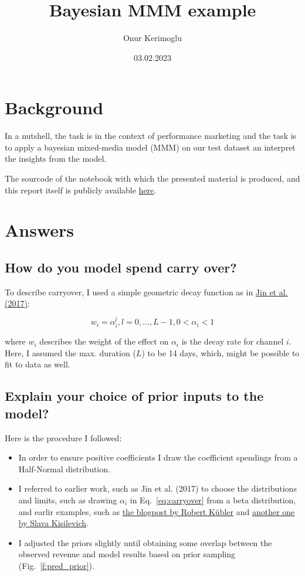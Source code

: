 \documentclass[a4paper,10pt]{scrartcl}
\title{Bayesian MMM example}
\author{Onur Kerimoglu}
\date{03.02.2023}
\begin{document}
\maketitle

\section{Background}
In a nutshell, the task is in the context of performance marketing and the task is to apply a bayesian mixed-media model (MMM) on our test dataset an interpret the insights from the model.

The sourcode of the notebook with which the presented material is produced, and this report itself is publicly available \href{https://github.com/OnurKerimoglu/bayesian_mmm/examples/bayesian_mmm_example_enhanced_newdataset.ipynb}{here}.

\section{Answers}

\subsection{How do you model spend carry over?}

To describe carryover, I used a simple geometric decay function as in \href{https://static.googleusercontent.com/media/research.google.com/en//pubs/archive/46001.pdf}{Jin et al. (2017)}:

\begin{equation}\label{eq:carryover}
 w_i = \alpha_i^l, l=0,...,L-1, 0<\alpha_i<1
\end{equation}

where $w_i$ describes the weight of the effect on   $\alpha_i$ is the decay rate for channel $i$. Here, I assumed the max. duration ($L$) to be 14 days, which, might be possible to fit to data as well.

\subsection {Explain your choice of prior inputs to the model?}

Here is the procedure I followed:
\begin{itemize}
 \item In order to ensure positive coefficients I draw the coefficient spendings from a Half-Normal distribution.
 \item I referred to earlier work, such as Jin et al. (2017) to choose the distributions and limits, such as drawing $\alpha_i$ in Eq.~\ref{eq:carryover} from a beta distribution, and earlir examples, such as \href{https://towardsdatascience.com/bayesian-marketing-mix-modeling-in-python-via-pymc3-7b2071f6001a}{the blogpost by Robert Kübler} and \href{https://towardsdatascience.com/modeling-marketing-mix-using-pymc3-ba18dd9e6e68}{another one by Slava Kisilevich}.
 \item I adjusted the priors slightly until obtaining some overlap between the observed revenue and model results based on prior sampling (Fig.~\ref{f:pred_prior}).
\end{itemize}
\end{document}

